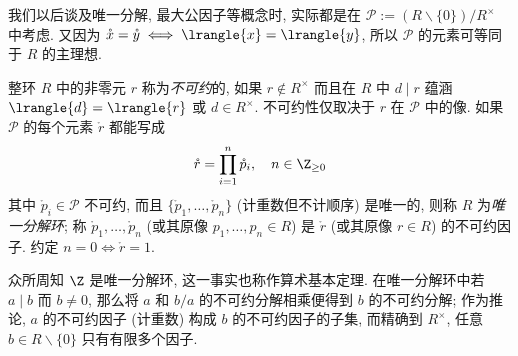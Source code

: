 我们以后谈及唯一分解, 最大公因子等概念时, 实际都是在 $\mathcal{P} := (R \smallsetminus \{0\})/R^\times$ 中考虑. 又因为 $\mathring{x} = \mathring{y} \iff \lrangle{x}=\lrangle{y}$, 所以 $\mathcal{P}$ 的元素可等同于 $R$ 的主理想.

\begin{definition}\label{def:UFD}
	整环 $R$ 中的非零元 $r$ 称为\emph{不可约}的, 如果 $r \notin R^\times$ 而且在 $R$ 中 $d \mid r$ 蕴涵 $\lrangle{d} = \lrangle{r}$ 或 $d \in R^\times$. 不可约性仅取决于 $r$ 在 $\mathcal{P}$ 中的像. 如果 $\mathcal{P}$ 的每个元素 $\mathring{r}$ 都能写成
	\[ \mathring{r} = \prod_{i=1}^n \mathring{p}_i, \quad n \in \Z_{\geq 0} \]
	其中 $\mathring{p}_i \in \mathcal{P}$ 不可约, 而且 $\{\mathring{p}_1, \ldots, \mathring{p}_n \}$ (计重数但不计顺序) 是唯一的, 则称 $R$ 为\emph{唯一分解环}; 称 $\mathring{p}_1, \ldots, \mathring{p}_n$ (或其原像 $p_1, \ldots, p_n \in R$) 是 $\mathring{r}$ (或其原像 $r \in R$) 的不可约因子. 约定 $n=0 \iff \mathring{r}=1$.
\end{definition}
众所周知 $\Z$ 是唯一分解环, 这一事实也称作算术基本定理. 在唯一分解环中若 $a \mid b$ 而 $b \neq 0$, 那么将 $a$ 和 $b/a$ 的不可约分解相乘便得到 $b$ 的不可约分解; 作为推论, $a$ 的不可约因子 (计重数) 构成 $b$ 的不可约因子的子集, 而精确到 $R^\times$, 任意 $b \in R \smallsetminus \{0\}$ 只有有限多个因子.

